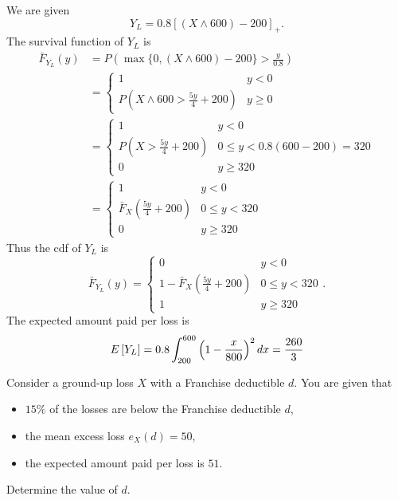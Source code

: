 \documentclass[notoc,notitlepage]{tufte-book}
\begin{document}
\begin{solution}
  We are given
  \begin{equation*}
    Y_L = 0.8 [ (X \land 600) - 200 ]_+.
  \end{equation*}
  The survival function of $Y_L$ is
  \begin{align*}
    \bar{F}_{Y_L}(y) &= P \left( \max \{ 0, (X \land 600) - 200\} > \frac{y}{0.8} \right) \\
      &= \begin{cases}
        1 & y < 0 \\
        P \left( X \land 600 > \frac{5y}{4} + 200 \right) & y \geq 0
      \end{cases} \\
      &= \begin{cases}
        1 & y < 0 \\
        P \left( X > \frac{5y}{4} + 200 \right) & 0 \leq y < 0.8(600 - 200) = 320 \\
        0 & y \geq 320
      \end{cases} \\
      &= \begin{cases}
        1 & y < 0 \\
        \bar{F}_X \left( \frac{5y}{4} + 200 \right) & 0 \leq y < 320 \\
        0 & y \geq 320
      \end{cases}
  \end{align*}
  Thus the cdf of $Y_L$ is
  \begin{equation*}
    \bar{F}_{Y_L}(y) = \begin{cases}
      0 & y < 0 \\
      1 - \bar{F}_X \left( \frac{5y}{4} + 200 \right) & 0 \leq y < 320 \\
      1 & y \geq 320
    \end{cases}.
  \end{equation*}
  The expected amount paid per loss is
  \begin{equation*}
    E \left[ Y_L \right] = 0.8 \int_{200}^{600} \left( 1 - \frac{x}{800} \right)^2 \mathop{}\!d{x} = \frac{260}{3}
  \end{equation*}
\end{solution}

\begin{eg}
  Consider a ground-up loss $X$ with a Franchise deductible $d$. You are given that
  \begin{itemize}
    \item $15\%$ of the losses are below the Franchise deductible $d$,
    \item the mean excess loss $e_X(d) = 50$,
    \item the expected amount paid per loss is $51$.
  \end{itemize}
  Determine the value of $d$.
\end{eg}
\end{document}
